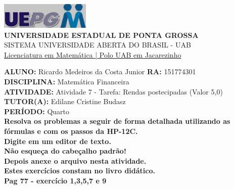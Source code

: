 \documentclass[a4paper, 12pt]{article}
\begin{document}
\begin{flushleft}\includegraphics{logo}\\
\textbf{UNIVERSIDADE ESTADUAL DE PONTA GROSSA} \\
SISTEMA UNIVERSIDADE ABERTA DO BRASIL - UAB \\
\underline{Licenciatura em Matemática | Polo UAB em Jacarezinho}\end{flushleft} 
\textbf{ALUNO:} Ricardo Medeiros da Costa Junior   \textbf{RA:} 151774301 \\
\textbf{DISCIPLINA:} Matemática Financeira \\
\textbf{ATIVIDADE:} Atividade 7 - Tarefa: Rendas postecipadas (Valor 5,0) \\
\textbf{TUTOR(A):} Edilane Cristine Budasz \\
\textbf{PERÍODO:} Quarto \\

\textbf{Resolva os problemas a seguir de forma detalhada utilizando as fórmulas e com os passos da HP-12C.}
\\
\textbf{Digite em um editor de texto.} \\
\textbf{Não esqueça do cabeçalho padrão!} \\
\textbf{Depois anexe o arquivo nesta atividade.} \\
\textbf{Estes exercícios constam no livro didático.} \\
\textbf{Pag 77 - exercício 1,3,5,7 e 9 }\\
\end{document}
